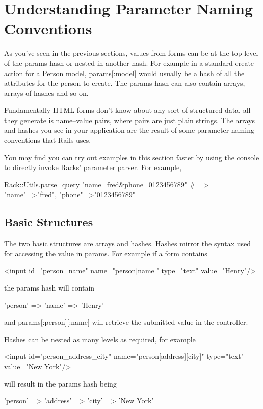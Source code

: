 \documentclass[10pt]{book}
\newenvironment{code}{%
  \scriptsize
    \verbatim
}{%
    \endverbatim
    \newline
}
\begin{document}
\section{ Understanding Parameter Naming Conventions}

As you’ve seen in the previous sections, values from forms can be at the top level of the params hash or nested in another hash. For example in a standard create action for a Person model, params[:model] would usually be a hash of all the attributes for the person to create. The params hash can also contain arrays, arrays of hashes and so on.

Fundamentally HTML forms don’t know about  any sort of structured data, all they generate is name–value pairs,  where pairs are just plain strings. The arrays and hashes you see in  your application are the result of some parameter naming conventions  that Rails uses.

You may find you can try out examples in this  section faster by using the console to directly invoke Racks’ parameter  parser. For example,
\begin{code}
Rack::Utils.parse_query "name=fred&phone=0123456789"
# => {"name"=>"fred", "phone"=>"0123456789"}
\end{code}

\subsection{ Basic Structures}

The two basic structures are arrays and hashes. Hashes mirror the syntax used for accessing the value in params. For example if a form contains
\begin{code}
<input id="person_name" name="person[name]" type="text" value="Henry"/>
\end{code}

the params hash will contain
\begin{code}
{'person' => {'name' => 'Henry'}}
\end{code}

and params[:person][:name] will retrieve the submitted value in the controller.

Hashes can be nested as many levels as required, for example
\begin{code}
<input id="person_address_city" name="person[address][city]" 
                              type="text" value="New York"/>
\end{code}

will result in the params hash being
\begin{code}
{'person' => {'address' => {'city' => 'New York'}}}
\end{code}
\end{document}
